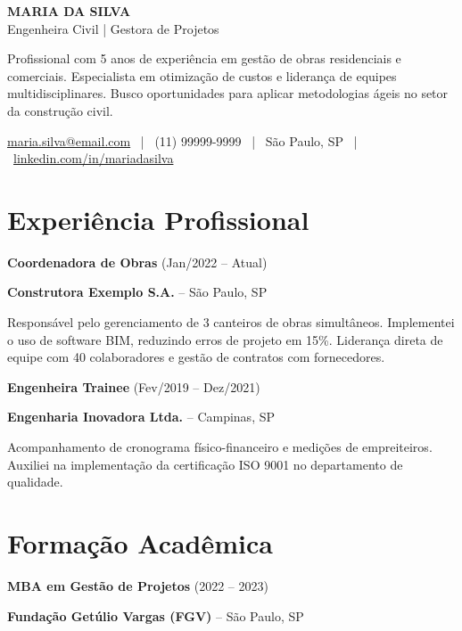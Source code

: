 \documentclass[11pt]{article}
\newcommand{\divider}{\textcolor{gray!30}{\hdashrule{\linewidth}{0.6pt}{0.5ex}}\medskip}
\newcommand{\cvitem}[5]{
	{\large \color{destaque} \textbf{#1} (#4)} \par
	\vspace{1mm}
	
	{\textbf{#2} -- #3} \par
	
	\vspace{2mm}
	
	{
		\small 
		\linespread{1.0}\selectfont 
		#5 
	}
	\par\vspace{4mm} 
}
\newcommand{\cvitemshort}[4]{
	{\large \color{destaque} \textbf{#1} (#4)} \par
	\vspace{1mm}
	{\textbf{#2} -- #3} \par
	\vspace{4mm} 
}
\begin{document}
	\thispagestyle{empty}
	
	\begin{center}
		{\Huge \bf MARIA DA SILVA} \\[0.5em]
		{\Large Engenheira Civil | Gestora de Projetos} \\[1em]
		
		\parbox{0.9\linewidth}{
			\centering
			Profissional com 5 anos de experiência em gestão de obras residenciais e comerciais. Especialista em otimização de custos e liderança de equipes multidisciplinares. Busco oportunidades para aplicar metodologias ágeis no setor da construção civil.
		}
		
		\vspace{3mm}
		
		\small
		\href{mailto:maria.silva@email.com}{maria.silva@email.com} \ | \ 
		(11) 99999-9999 \ | \ 
		São Paulo, SP \ | \ 
		\href{https://linkedin.com/in/mariadasilva}{linkedin.com/in/mariadasilva}
	\end{center}
	
	\vspace{3mm}
	
	\section*{Experiência Profissional}
	
	\cvitem{Coordenadora de Obras}
	{Construtora Exemplo S.A.}
	{São Paulo, SP}
	{Jan/2022 -- Atual}
	{Responsável pelo gerenciamento de 3 canteiros de obras simultâneos. Implementei o uso de software BIM, reduzindo erros de projeto em 15\%. Liderança direta de equipe com 40 colaboradores e gestão de contratos com fornecedores.}
	
	\divider
	
	\cvitem{Engenheira Trainee}
	{Engenharia Inovadora Ltda.}
	{Campinas, SP}
	{Fev/2019 -- Dez/2021}
	{Acompanhamento de cronograma físico-financeiro e medições de empreiteiros. Auxiliei na implementação da certificação ISO 9001 no departamento de qualidade.}
	
	\vspace{2mm}
	
	\section*{Formação Acadêmica}
	
	\cvitemshort{MBA em Gestão de Projetos}
	{Fundação Getúlio Vargas (FGV)}
	{São Paulo, SP}
	{2022 -- 2023}
	
\end{document}
